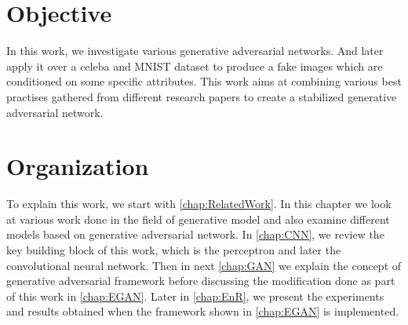 \section{Objective}

In this work, we investigate various generative adversarial networks. And later apply it over a celeba \cite{celeba} and MNIST \cite{MNIST} dataset to produce a fake images which are conditioned on some specific attributes. This work aims at combining various best practises gathered from different research papers to create a stabilized generative adversarial network.  


\section{Organization}

To explain this work, we start with  \autoref{chap:RelatedWork}. In this chapter we look at various work done in the field of generative model and also examine different models based on generative adversarial network. In \autoref{chap:CNN}, we review the key building block of this work, which is the perceptron and later the convolutional neural network. Then in next \autoref{chap:GAN} we explain the concept of generative adversarial framework before discussing the modification done as part of this work in \autoref{chap:EGAN}. Later in \autoref{chap:EnR}, we present the experiments and results obtained when the framework shown in \autoref{chap:EGAN} is implemented.
